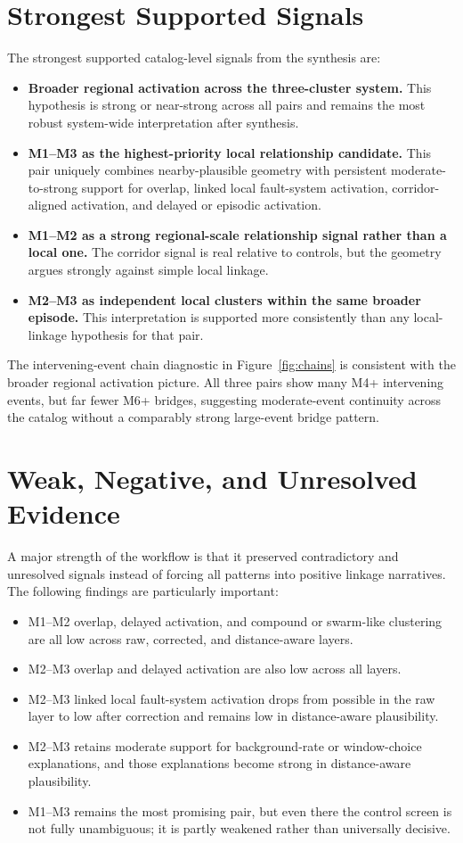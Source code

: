 \documentclass[11pt]{article}
\begin{document}
\section{Strongest Supported Signals}
The strongest supported catalog-level signals from the synthesis are:
\begin{itemize}
    \item \textbf{Broader regional activation across the three-cluster system.} This hypothesis is strong or near-strong across all pairs and remains the most robust system-wide interpretation after synthesis.
    \item \textbf{M1--M3 as the highest-priority local relationship candidate.} This pair uniquely combines nearby-plausible geometry with persistent moderate-to-strong support for overlap, linked local fault-system activation, corridor-aligned activation, and delayed or episodic activation.
    \item \textbf{M1--M2 as a strong regional-scale relationship signal rather than a local one.} The corridor signal is real relative to controls, but the geometry argues strongly against simple local linkage.
    \item \textbf{M2--M3 as independent local clusters within the same broader episode.} This interpretation is supported more consistently than any local-linkage hypothesis for that pair.
\end{itemize}

The intervening-event chain diagnostic in Figure~\ref{fig:chains} is consistent with the broader regional activation picture. All three pairs show many M4+ intervening events, but far fewer M6+ bridges, suggesting moderate-event continuity across the catalog without a comparably strong large-event bridge pattern.

\section{Weak, Negative, and Unresolved Evidence}
A major strength of the workflow is that it preserved contradictory and unresolved signals instead of forcing all patterns into positive linkage narratives. The following findings are particularly important:
\begin{itemize}
    \item M1--M2 overlap, delayed activation, and compound or swarm-like clustering are all low across raw, corrected, and distance-aware layers.
    \item M2--M3 overlap and delayed activation are also low across all layers.
    \item M2--M3 linked local fault-system activation drops from possible in the raw layer to low after correction and remains low in distance-aware plausibility.
    \item M2--M3 retains moderate support for background-rate or window-choice explanations, and those explanations become strong in distance-aware plausibility.
    \item M1--M3 remains the most promising pair, but even there the control screen is not fully unambiguous; it is partly weakened rather than universally decisive.
\end{itemize}
\end{document}
